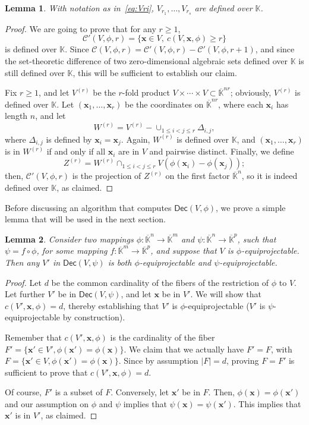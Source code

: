 \documentclass[12pt]{article}
\def\K {\ensuremath{\mathbb{K}}}
\def\Kbar {\ensuremath{\overline{\mathbb{K}}}}
\def\x {\ensuremath{\mathbf{x}}}
\def\Dec {\ensuremath{\mathsf{Dec}}}
\newtheorem{Lemma}{Lemma}
\begin{document}
\begin{Lemma}\label{lemma:def}
  With notation as in~\eqref{eq:Vri}, $V_{r_1},\dots,V_{r_s}$ are
  defined over $\K$.
\end{Lemma}
\begin{proof}
  We are going to prove that for any $r \ge 1$,
  $$\mathscr{C}'(V,\phi,r)=\{\x \in V,\ c(V,\x,\phi)\ge r\}$$ is defined over
  $\K$.  Since $\mathscr{C}(V,\phi,r)=\mathscr{C}'(V,\phi,r)-\mathscr{C}'(V,\phi,r+1)$, and since
  the set-theoretic difference of two zero-dimensional algebraic sets
  defined over $\K$ is still defined over $\K$, this will be
  sufficient to establish our claim.

  Fix $r \ge 1$, and let $V^{(r)}$ be the $r$-fold product $V \times
  \cdots \times V \subset \Kbar^{nr}$; obviously, $V^{(r)}$ is defined
  over $\K$. Let $(\x_1,\dots,\x_r)$ be the coordinates on
  $\Kbar^{nr}$, where each $\x_i$ has length $n$, and let
  $$W^{(r)}=V^{(r)}-\cup_{1 \le i < j \le r} \Delta_{i,j},$$ where
  $\Delta_{i,j}$ is defined by $\x_i=\x_j$. Again, $W^{(r)}$ is
  defined over $\K$, and $(\x_1,\dots,\x_r)$ is in $W^{(r)}$ if and
  only if all $\x_i$ are in $V$ and pairwise distinct. Finally, we
  define
  $$Z^{(r)}=W^{(r)} \cap_{1 \le i < j \le r} V(\phi(\x_i)-\phi(\x_j));$$
  then, $\mathscr{C}'(V,\phi,r)$ is the projection of $Z^{(r)}$ on the first
  factor $\Kbar^n$, so it is indeed defined over $\K$, as claimed.
\end{proof}

Before discussing an algorithm that computes $\Dec(V,\phi)$, we prove
a simple lemma that will be used in the next section.
\begin{Lemma}\label{lemma:comp}
  Consider two mappings $\phi:\Kbar^n \to \Kbar^m$ and $\psi:\Kbar^n
  \to \Kbar^p$, such that $\psi = f \circ \phi$, for some mapping $f:
  \Kbar^m \to \Kbar^p$, and suppose that $V$ is
  $\phi$-equiprojectable. Then any $V'$ in $\Dec(V,\psi)$ is both
  $\phi$-equiprojectable and $\psi$-equiprojectable.
\end{Lemma}
\begin{proof} Let $d$ be the common cardinality of the fibers of the
  restriction of $\phi$ to $V$. Let further $V'$ be in $\Dec(V,\psi)$,
  and let $\x$ be in $V'$. We will show that $c(V',\x,\phi)=d$,
  thereby establishing that $V'$ is $\phi$-equiprojectable ($V'$ is
  $\psi$-equiprojectable by construction).
  
  Remember that $c(V',\x,\phi)$ is the cardinality of the fiber
  $F'=\{\x' \in V', \phi(\x')=\phi(\x)\}$. We claim that we actually
  have $F'=F$, with $F=\{\x' \in V, \phi(\x')=\phi(\x)\}$. Since by
  assumption $|F|=d$, proving $F=F'$ is sufficient to prove that
  $c(V',\x,\phi)=d$.

  Of course, $F'$ is a subset of $F$. Conversely, let $\x'$ be in $F$.
  Then, $\phi(\x)=\phi(\x')$ and our assumption on $\phi$ and $\psi$
  implies that $\psi(\x)=\psi(\x')$. This implies that $\x'$ is in
  $V'$, as claimed.
\end{proof}
\end{document}
